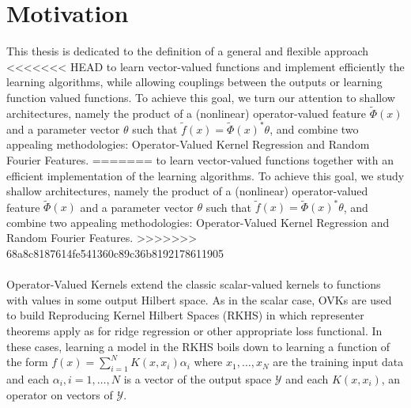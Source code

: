 \section{Motivation}
This thesis is dedicated to the definition of a general and flexible approach
<<<<<<< HEAD
to learn vector-valued functions and implement efficiently the learning
algorithms, while allowing couplings between the outputs or learning function
valued functions. To achieve this goal, we turn our attention to shallow
architectures, namely the product of a (nonlinear) operator-valued feature
$\tilde{\Phi}(x)$ and a parameter vector $\theta$ such that $\tilde{f}(x) =
\tilde{\Phi}(x)^* \theta$, and combine two appealing methodologies:
Operator-Valued Kernel Regression and Random Fourier Features.
=======
to learn vector-valued functions together with an efficient implementation of the learning
algorithms. To achieve this goal, we study shallow architectures,
namely the product of a (nonlinear) operator-valued feature $\tilde{\Phi}(x)$
and a parameter vector $\theta$ such that $\tilde{f}(x) = \tilde{\Phi}(x)^*
\theta$, and combine two appealing methodologies: Operator-Valued Kernel
Regression and Random Fourier Features.
>>>>>>> 68a8c8187614fe541360c89c36b8192178611905
\paragraph{}
Operator-Valued Kernels \citep{Micchelli2005,Carmeli2010,Kadri_aistat10, Brouard2011,Alvarez2012} extend
the classic scalar-valued kernels to functions with values in some output Hilbert space. As in the scalar
case, \acfp{OVK} are used to build Reproducing Kernel
Hilbert Spaces (\acs{RKHS}) in which representer theorems apply as for ridge
regression or other appropriate loss functional. In these cases, learning a
model in the \acs{RKHS} boils down to learning a function of the form
$f(x)=\sum_{i=1}^N K(x,x_i)\alpha_i$ where $x_1, \ldots, x_N$ are the training
input data and each $\alpha_i, i=1, \ldots, N$ is a vector of the output space
$\mathcal{Y}$ and each $K(x,x_i)$, an operator on vectors of $\mathcal{Y}$.
